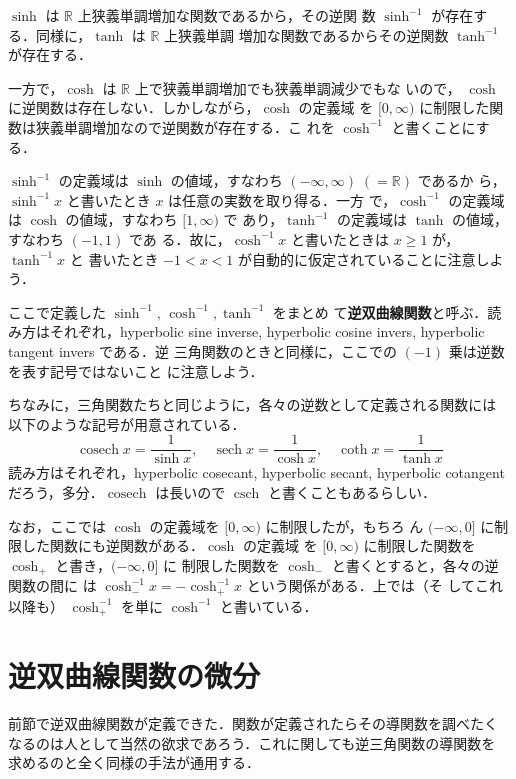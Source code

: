 \documentclass[dvipdfmx,12pt, uplatex]{jsarticle}
\DeclareMathOperator{\cosech}{cosech}
\DeclareMathOperator{\sech}{sech}
\DeclareMathOperator{\csch}{csch}
\begin{document}
$\sinh$ は $\mathbb{R}$ 上狭義単調増加な関数であるから，その逆関
数 $\sinh^{-1}$ が存在する．同様に，$\tanh$ は $\mathbb{R}$ 上狭義単調
増加な関数であるからその逆関数 $\tanh^{-1}$ が存在する．

一方で，$\cosh$ は $\mathbb{R}$ 上で狭義単調増加でも狭義単調減少でもな
いので， $\cosh$ に逆関数は存在しない．しかしながら，$\cosh$ の定義域
を $[0, \infty)$ に制限した関数は狭義単調増加なので逆関数が存在する．こ
れを $\cosh^{-1}$ と書くことにする．

$\sinh^{-1}$ の定義域は $\sinh$ の値域，すなわち
$(-\infty, \infty) \; \left(= \mathbb{R}\right)$ であるか
ら，$\sinh^{-1}x$ と書いたとき $x$ は任意の実数を取り得る．一方
で，$\cosh^{-1}$ の定義域は $\cosh$ の値域，すなわち $[1, \infty)$ で
あり，$\tanh^{-1}$ の定義域は $\tanh$ の値域，すなわち  $(-1,1)$ であ
る．故に，$\cosh^{-1}x$ と書いたときは $x \geq 1$ が，$\tanh^{-1}x$ と
書いたとき $-1 < x < 1$ が自動的に仮定されていることに注意しよう．

ここで定義した $\sinh^{-1}, \, \cosh^{-1}, \tanh^{-1}$ をまとめ
て\textbf{逆双曲線関数}と呼ぶ．読み方はそれぞれ，hyperbolic sine
inverse, hyperbolic cosine invers, hyperbolic tangent invers である．逆
三角関数のときと同様に，ここでの $(-1)$ 乗は逆数を表す記号ではないこと
に注意しよう．

ちなみに，三角関数たちと同じように，各々の逆数として定義される関数には
以下のような記号が用意されている．
\[
\cosech x = \frac{1}{\sinh x}, \quad \sech x = \frac{1}{\cosh x}, \quad \coth x = \frac{1}{\tanh x}
\]
読み方はそれぞれ，hyperbolic cosecant, hyperbolic secant, hyperbolic
cotangent だろう，多分．$\cosech$ は長いので $\csch$
と書くこともあるらしい．


なお，ここでは $\cosh$ の定義域を $[0, \infty)$ に制限したが，もちろ
ん $(-\infty, 0]$ に制限した関数にも逆関数がある．$\cosh$ の定義域
を $[0, \infty)$ に制限した関数を $\cosh_{+}$ と書き，$(-\infty, 0]$ に
制限した関数を $\cosh_{-}$ と書くとすると，各々の逆関数の間に
は $\cosh_{-}^{-1} x = - \cosh_{+}^{-1}x$ という関係がある．上では（そ
してこれ以降も） $\cosh_{+}^{-1}$ を単に $\cosh^{-1}$ と書いている．

\section{逆双曲線関数の微分}\label{diff-inv}

前節で逆双曲線関数が定義できた．関数が定義されたらその導関数を調べたく
なるのは人として当然の欲求であろう．これに関しても逆三角関数の導関数を
求めるのと全く同様の手法が通用する．
\end{document}
